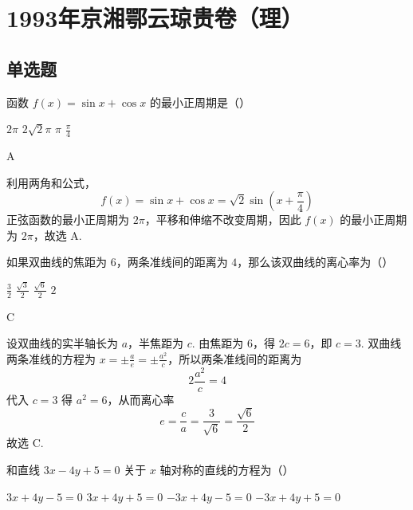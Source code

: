 \documentclass[UTF8,a4paper,oneside,11pt]{ctexbook}
\begin{document}
\mainmatter

\chapter{1993年京湘鄂云琼贵卷（理）}
\section{单选题}

\begin{problem}
函数 \(f(x)=\sin x+\cos x\) 的最小正周期是（\quad）

\choices
    {\(2\pi\)}
    {\(2\sqrt{2}\pi\)}
    {\(\pi\)}
    {\(\frac{\pi}{4}\)}
\end{problem}

\begin{answer}
A
\end{answer}

\begin{solution}
利用两角和公式，
\[
f(x)=\sin x+\cos x=\sqrt{2}\sin\left(x+\frac{\pi}{4}\right)
\]
正弦函数的最小正周期为 \(2\pi\)，平移和伸缩不改变周期，因此 \(f(x)\) 的最小正周期为 \(2\pi\)，故选 A.
\end{solution}

\begin{problem}
如果双曲线的焦距为 \(6\)，两条准线间的距离为 \(4\)，那么该双曲线的离心率为（\quad）

\choices
    {\(\frac{3}{2}\)}
    {\(\frac{\sqrt{3}}{2}\)}
    {\(\frac{\sqrt{6}}{2}\)}
    {\(2\)}
\end{problem}

\begin{answer}
C
\end{answer}

\begin{solution}
设双曲线的实半轴长为 \(a\)，半焦距为 \(c\). 由焦距为 \(6\)，得 \(2c=6\)，即 \(c=3\). 双曲线两条准线的方程为 \(x=\pm\frac{a}{e}=\pm\frac{a^2}{c}\)，所以两条准线间的距离为
\[
2\frac{a^2}{c}=4
\]
代入 \(c=3\) 得 \(a^2=6\)，从而离心率
\[
e=\frac{c}{a}=\frac{3}{\sqrt{6}}=\frac{\sqrt{6}}{2}
\]
故选 C.
\end{solution}

\begin{problem}
和直线 \(3x-4y+5=0\) 关于 \(x\) 轴对称的直线的方程为（\quad）

\choices
    {\(3x+4y-5=0\)}
    {\(3x+4y+5=0\)}
    {\(-3x+4y-5=0\)}
    {\(-3x+4y+5=0\)}
\end{problem}
\end{document}
